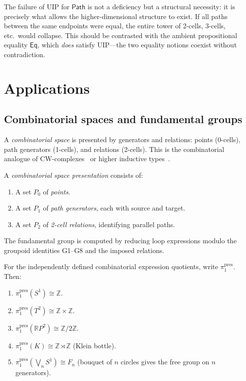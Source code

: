 \documentclass[manuscript]{BSLstyle}
\newcommand{\Path}{\mathsf{Path}}
\newcommand{\Eq}{\mathsf{Eq}}
\newcommand{\Z}{\mathbb{Z}}
\begin{document}
\begin{remark}
The failure of UIP for $\Path$ is not a deficiency but a structural
necessity: it is precisely what allows the higher-dimensional structure
to exist.  If all paths between the same endpoints were equal, the
entire tower of 2-cells, 3-cells, etc.\ would collapse.
This should be contrasted with the ambient propositional equality $\Eq$,
which \emph{does} satisfy UIP---the two equality notions coexist without
contradiction.
\end{remark}

\section{Applications}\label{sec:applications}

\subsection{Combinatorial spaces and fundamental groups}

A \emph{combinatorial space} is presented by generators and relations:
points (0-cells), path generators (1-cells), and relations (2-cells).
This is the combinatorial analogue of CW-complexes~\cite{Hatcher02} or
higher inductive types~\cite{hottbook}.

\begin{definition}\label{def:comb-space}
A \emph{combinatorial space presentation} consists of:
\begin{enumerate}
\item A set $P_0$ of \emph{points}.
\item A set $P_1$ of \emph{path generators}, each with source and target.
\item A set $P_2$ of \emph{2-cell relations}, identifying parallel paths.
\end{enumerate}
The fundamental group is computed by reducing loop expressions modulo the
groupoid identities G1--G8 and the imposed relations.
\end{definition}

\begin{theorem}\label{thm:pi1-computations}
For the independently defined combinatorial expression quotients, write
\(\pi_1^{\mathrm{pres}}\).  Then:
\begin{enumerate}[label=(\alph*)]
\item $\pi_1^{\mathrm{pres}}(S^1) \cong \Z$.
\item $\pi_1^{\mathrm{pres}}(T^2) \cong \Z \times \Z$.
\item $\pi_1^{\mathrm{pres}}(\mathbb{R}P^2) \cong \Z/2\Z$.
\item $\pi_1^{\mathrm{pres}}(K) \cong \Z \rtimes \Z$ (Klein bottle).
\item $\pi_1^{\mathrm{pres}}(\bigvee_n S^1) \cong F_n$ (bouquet of $n$ circles gives the
  free group on $n$ generators).
\end{enumerate}
\end{theorem}
\end{document}
